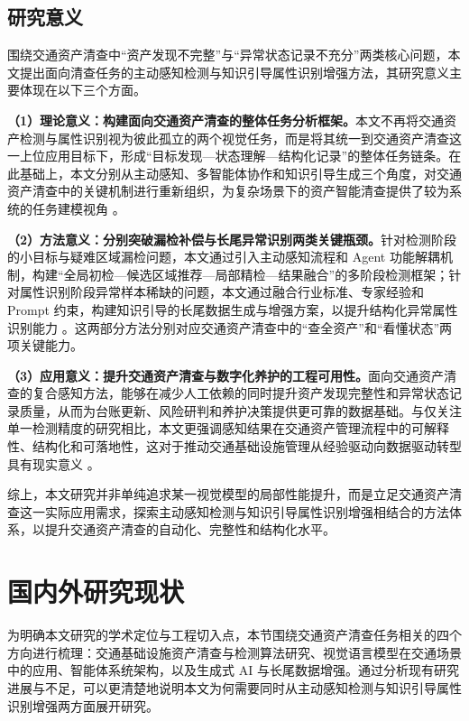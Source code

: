 \subsection{研究意义}
围绕交通资产清查中“资产发现不完整”与“异常状态记录不充分”两类核心问题，本文提出面向清查任务的主动感知检测与知识引导属性识别增强方法，其研究意义主要体现在以下三个方面。

\textbf{（1）理论意义：构建面向交通资产清查的整体任务分析框架。}本文不再将交通资产检测与属性识别视为彼此孤立的两个视觉任务，而是将其统一到交通资产清查这一上位应用目标下，形成“目标发现—状态理解—结构化记录”的整体任务链条。在此基础上，本文分别从主动感知、多智能体协作和知识引导生成三个角度，对交通资产清查中的关键机制进行重新组织，为复杂场景下的资产智能清查提供了较为系统的任务建模视角 \cite{agentthink2025,functional_agent}。

\textbf{（2）方法意义：分别突破漏检补偿与长尾异常识别两类关键瓶颈。}针对检测阶段的小目标与疑难区域漏检问题，本文通过引入主动感知流程和 Agent 功能解耦机制，构建“全局初检—候选区域推荐—局部精检—结果融合”的多阶段检测框架；针对属性识别阶段异常样本稀缺的问题，本文通过融合行业标准、专家经验和 Prompt 约束，构建知识引导的长尾数据生成与增强方案，以提升结构化异常属性识别能力 \cite{gb5768_2022,domain_knowledge_gen}。这两部分方法分别对应交通资产清查中的“查全资产”和“看懂状态”两项关键能力。

\textbf{（3）应用意义：提升交通资产清查与数字化养护的工程可用性。}面向交通资产清查的复合感知方法，能够在减少人工依赖的同时提升资产发现完整性和异常状态记录质量，从而为台账更新、风险研判和养护决策提供更可靠的数据基础。与仅关注单一检测精度的研究相比，本文更强调感知结果在交通资产管理流程中的可解释性、结构化和可落地性，这对于推动交通基础设施管理从经验驱动向数据驱动转型具有现实意义 \cite{omnisight_ai,roadvision_ai,vru_sensing2024}。

综上，本文研究并非单纯追求某一视觉模型的局部性能提升，而是立足交通资产清查这一实际应用需求，探索主动感知检测与知识引导属性识别增强相结合的方法体系，以提升交通资产清查的自动化、完整性和结构化水平。

\section{国内外研究现状}

为明确本文研究的学术定位与工程切入点，本节围绕交通资产清查任务相关的四个方向进行梳理：交通基础设施资产清查与检测算法研究、视觉语言模型在交通场景中的应用、智能体系统架构，以及生成式 AI 与长尾数据增强。通过分析现有研究进展与不足，可以更清楚地说明本文为何需要同时从主动感知检测与知识引导属性识别增强两方面展开研究。

